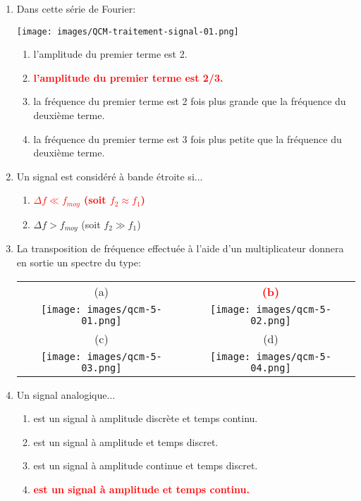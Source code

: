 \documentclass[a4paper]{article}
\begin{document}
\begin{enumerate}[label=Q\arabic*.]


\item Dans cette série de Fourier:
\begin{center}
    \texttt{[image: images/QCM-traitement-signal-01.png]}
\end{center}
\begin{enumerate}
    \item l'amplitude du premier terme est 2.
    \item \textcolor{red}{\textbf{l'amplitude du premier terme est 2/3.}}
    \item la fréquence du premier terme est 2 fois plus grande que la fréquence du deuxième terme.
    \item la fréquence du premier terme est 3 fois plus petite que la fréquence du deuxième terme.
\end{enumerate}


\item Un signal est considéré à bande étroite si...
\begin{enumerate}
    \item \textcolor{red}{\textbf{$ \Delta f \ll f_{moy} $ (soit $ f_2 \approx f_1 $)}}
    \item $ \Delta f > f_{moy} $ (soit $ f_2 \gg f_1 $)
\end{enumerate}


\item La transposition de fréquence effectuée à l'aide d'un multiplicateur donnera en sortie un spectre du type:
\begin{center} \begin{tabular}{cc}
    (a) & \textcolor{red}{\textbf{(b)}} \\
    \texttt{[image: images/qcm-5-01.png]} &
    \texttt{[image: images/qcm-5-02.png]} \\
    (c) & (d) \\
    \texttt{[image: images/qcm-5-03.png]} &
    \texttt{[image: images/qcm-5-04.png]}
\end{tabular} \end{center}


\item Un signal analogique...
\begin{enumerate}
    \item est un signal à amplitude discrète et temps continu.
    \item est un signal à amplitude et temps discret.
    \item est un signal à amplitude continue et temps discret.
    \item \textcolor{red}{\textbf{est un signal à amplitude et temps continu.}}
\end{enumerate}



\end{enumerate}
\end{document}
